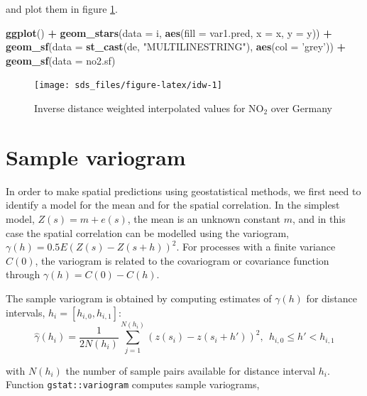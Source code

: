 \documentclass[]{book}
\newenvironment{Shaded}{\begin{snugshade}}{\end{snugshade}}
\newcommand{\DataTypeTok}[1]{\textcolor[rgb]{0.13,0.29,0.53}{#1}}
\newcommand{\KeywordTok}[1]{\textcolor[rgb]{0.13,0.29,0.53}{\textbf{#1}}}
\newcommand{\NormalTok}[1]{#1}
\newcommand{\OperatorTok}[1]{\textcolor[rgb]{0.81,0.36,0.00}{\textbf{#1}}}
\newcommand{\StringTok}[1]{\textcolor[rgb]{0.31,0.60,0.02}{#1}}
\begin{document}
and plot them in figure \ref{fig:idw}.



\begin{Shaded}
\begin{Highlighting}[]
\KeywordTok{ggplot}\NormalTok{() }\OperatorTok{+}\StringTok{ }\KeywordTok{geom_stars}\NormalTok{(}\DataTypeTok{data =}\NormalTok{ i, }\KeywordTok{aes}\NormalTok{(}\DataTypeTok{fill =}\NormalTok{ var1.pred, }\DataTypeTok{x =}\NormalTok{ x, }\DataTypeTok{y =}\NormalTok{ y)) }\OperatorTok{+}\StringTok{ }
\StringTok{    }\KeywordTok{geom_sf}\NormalTok{(}\DataTypeTok{data =} \KeywordTok{st_cast}\NormalTok{(de, }\StringTok{"MULTILINESTRING"}\NormalTok{), }\KeywordTok{aes}\NormalTok{(}\DataTypeTok{col =} \StringTok{'grey'}\NormalTok{)) }\OperatorTok{+}\StringTok{ }
\StringTok{    }\KeywordTok{geom_sf}\NormalTok{(}\DataTypeTok{data =}\NormalTok{ no2.sf)}
\end{Highlighting}
\end{Shaded}

\begin{figure}

{\centering \texttt{[image: sds\_files/figure-latex/idw-1]} 

}

\caption{Inverse distance weighted interpolated values for NO\(_2\) over Germany}\label{fig:idw}
\end{figure}

\hypertarget{sample-variogram}{%
\section{Sample variogram}\label{sample-variogram}}

In order to make spatial predictions using geostatistical methods, we first need to identify a model for the mean and for the spatial correlation. In the simplest model, \(Z(s) = m + e(s)\), the mean is an unknown constant \(m\), and in this case the spatial correlation can be modelled using the variogram, \(\gamma(h) = 0.5 E (Z(s)-Z(s+h))^2\). For processes with a finite variance \(C(0)\), the variogram is related to the covariogram or covariance function through \(\gamma(h) = C(0)-C(h)\).

The sample variogram is obtained by computing estimates of \(\gamma(h)\) for distance intervals, \(h_i = [h_{i,0},h_{i,1}]\):
\[
\hat{\gamma}(h_i) = \frac{1}{2N(h_i)}\sum_{j=1}^{N(h_i)}(z(s_i)-z(s_i+h'))^2, \ \ h_{i,0} \le h' < h_{i,1}
\]

with \(N(h_i)\) the number of sample pairs available for distance interval \(h_i\).
Function \texttt{gstat::variogram} computes sample variograms,
\end{document}
